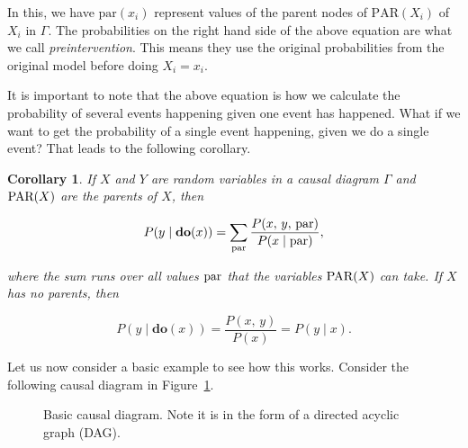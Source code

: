 \documentclass{article}
\newtheorem{corollary}{Corollary}[theorem]
\begin{document}
In this, we have $\text{par}(x_i)$ represent values of the parent nodes of $\text{PAR}(X_i)$ of $X_i$ in $\Gamma$.
The probabilities on the right hand side of the above equation are what we call \textit{preintervention}. 
This means they use the original probabilities from the original model before doing $X_i = x_i$.

It is important to note that the above equation is how we calculate the probability of several events 
happening given one event has happened. What if we want to get the probability of a single event happening, 
given we do a single event? That leads to the following corollary.

\begin{corollary}
    If $X$ and $Y$ are random variables in a causal diagram $\Gamma$ and $\textup{PAR}(X)$ are the parents of $X$, then

    \[P(y\;|\;  \textbf{do}(x)) = \sum_{\textup{par}}\frac{P(x,\,y,\,\textup{par})}{P(x\;|\; \textup{par})},\]

    where the sum runs over all values $\textup{par}$ that the variables $\textup{PAR}(X)$ can take. If $X$ has no parents, then

    \[P(y\;|\; \textbf{do}(x)) = \frac{P(x,\,y)}{P(x)} = P(y\;|\; x).\]
    \label{corollary:do}
\end{corollary}

Let us now consider a basic example to see how this works. Consider the following causal diagram in Figure~\ref{fig:causal_dia}.

\begin{figure}[h]
    \centering
    \caption{Basic causal diagram. Note it is in the form of a directed acyclic graph (DAG).}
    \label{fig:causal_dia}
\end{figure}
\end{document}
